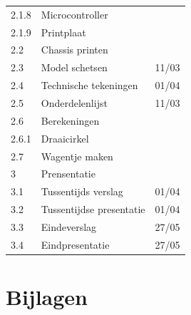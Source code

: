 \documentclass[twoside,kulak]{kulakreport} %
\begin{document}
\begin{tabular}{lll}
		2.1.8 & Microcontroller & \\
		2.1.9 & Printplaat & \\
		2.2 & Chassis printen & \\
		2.3 & Model schetsen & 11/03\\
		2.4 & Technische tekeningen & 01/04\\
		2.5 & Onderdelenlijst & 11/03\\
		2.6 & Berekeningen & \\
		2.6.1 & Draaicirkel & \\
		2.7 & Wagentje maken & \\
		\hline
		3 & Prensentatie & \\
		3.1 & Tussentijds verslag & 01/04 \\
		3.2 & Tussentijdse presentatie & 01/04\\
		3.3 & Eindeverslag & 27/05 \\
		3.4 & Eindpresentatie & 27/05\\ \hline
	\end{tabular}


	
	\chapter{Bijlagen}
	
\end{document}
